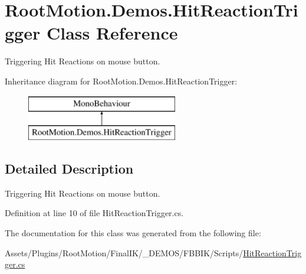 \hypertarget{class_root_motion_1_1_demos_1_1_hit_reaction_trigger}{}\section{Root\+Motion.\+Demos.\+Hit\+Reaction\+Trigger Class Reference}
\label{class_root_motion_1_1_demos_1_1_hit_reaction_trigger}


Triggering Hit Reactions on mouse button.  


Inheritance diagram for Root\+Motion.\+Demos.\+Hit\+Reaction\+Trigger\+:\begin{figure}[H]
\begin{center}
\leavevmode
\includegraphics[height=2.000000cm]{class_root_motion_1_1_demos_1_1_hit_reaction_trigger}
\end{center}
\end{figure}


\subsection{Detailed Description}
Triggering Hit Reactions on mouse button. 



Definition at line 10 of file Hit\+Reaction\+Trigger.\+cs.



The documentation for this class was generated from the following file\+:\begin{DoxyCompactItemize}
\item 
Assets/\+Plugins/\+Root\+Motion/\+Final\+I\+K/\+\_\+\+D\+E\+M\+O\+S/\+F\+B\+B\+I\+K/\+Scripts/\mbox{\hyperlink{_hit_reaction_trigger_8cs}{Hit\+Reaction\+Trigger.\+cs}}\end{DoxyCompactItemize}
